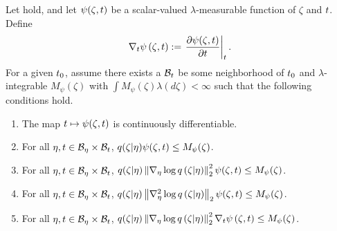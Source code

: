 \begin{assu}
%
Let  hold, and let $\psi(\zeta, t)$ be a scalar-valued
$\lambda$-measurable function of $\zeta$ and $t$.  Define
%
\begin{align*}
%
\psigrad{\zeta, \t} := \fracat{\partial \psi(\zeta, \t)}{\partial \t}{\t}.
%
\end{align*}
%
For a given $t_0$, assume
there exists a $\mathcal{B}_t$ be some neighborhood of $t_0$ and
$\lambda$-integrable $M_\psi(\zeta)$ with $\int M_\psi(\zeta) \lambda(d\zeta) <
\infty$ such that the following conditions hold.
%
\begin{enumerate}
%
\item  {} The map $t \mapsto \psi(\zeta, t)$ is
continuously differentiable.
%
\item {} For all $\eta, t \in \mathcal{B}_\eta \times \mathcal{B}_t$,
$q(\zeta \vert \eta) \psi(\zeta, t) \le M_\psi(\zeta)$.
%
\item {} For all $\eta, t \in \mathcal{B}_\eta \times \mathcal{B}_t$,
$q(\zeta \vert \eta) \left\Vert{\nabla_\eta \log q}\left(\zeta \vert \eta\right)\right\Vert^2_2 \psi(\zeta, t) \le
M_\psi(\zeta)$.
%
\item {} For all $\eta, t \in \mathcal{B}_\eta \times \mathcal{B}_t$,
$q(\zeta \vert \eta) \left\Vert{\nabla_\eta^2 \log q}\left(\zeta \vert \eta\right)\right\Vert_2 \psi(\zeta, t) \le
M_\psi(\zeta)$.
%
\item {} For all $\eta, t \in \mathcal{B}_\eta \times \mathcal{B}_t$,
$q(\zeta \vert \eta) \left\Vert{\nabla_\eta \log q}\left(\zeta \vert \eta\right)\right\Vert^2_2 {\nabla_t \psi}\left(\zeta, t\right)
\le M_\psi(\zeta)$.
%
\end{enumerate}
%
\end{assu}

%

